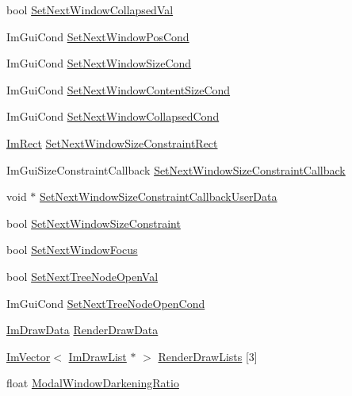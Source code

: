 \begin{DoxyCompactItemize}
\item 
bool \hyperlink{struct_im_gui_context_a81c9c14d3ab622586aa5ca0866634b21}{Set\+Next\+Window\+Collapsed\+Val}
\item 
Im\+Gui\+Cond \hyperlink{struct_im_gui_context_afdf440b5e79ba7868e87e2c5136e1296}{Set\+Next\+Window\+Pos\+Cond}
\item 
Im\+Gui\+Cond \hyperlink{struct_im_gui_context_ad0a5c6930741d040141ab7b097064c20}{Set\+Next\+Window\+Size\+Cond}
\item 
Im\+Gui\+Cond \hyperlink{struct_im_gui_context_af19b3352e14a7ac48f8c9a58e63eda9b}{Set\+Next\+Window\+Content\+Size\+Cond}
\item 
Im\+Gui\+Cond \hyperlink{struct_im_gui_context_a90e757b4703c106ecd41b05670f5799a}{Set\+Next\+Window\+Collapsed\+Cond}
\item 
\hyperlink{struct_im_rect}{Im\+Rect} \hyperlink{struct_im_gui_context_ab0e529d62651845ef9ae265447e1d0c8}{Set\+Next\+Window\+Size\+Constraint\+Rect}
\item 
Im\+Gui\+Size\+Constraint\+Callback \hyperlink{struct_im_gui_context_a304a1bfd5dbcebee45ba8cdfa5d231cb}{Set\+Next\+Window\+Size\+Constraint\+Callback}
\item 
void $\ast$ \hyperlink{struct_im_gui_context_a5da8374c369cff287b16ac7d8e3a7901}{Set\+Next\+Window\+Size\+Constraint\+Callback\+User\+Data}
\item 
bool \hyperlink{struct_im_gui_context_a9d2204e10eb23d9ab8aa653b555fb851}{Set\+Next\+Window\+Size\+Constraint}
\item 
bool \hyperlink{struct_im_gui_context_a11a744f855421fedef4adff0cac48bcb}{Set\+Next\+Window\+Focus}
\item 
bool \hyperlink{struct_im_gui_context_aab81a8f92b73046a0277f77fad4dcc85}{Set\+Next\+Tree\+Node\+Open\+Val}
\item 
Im\+Gui\+Cond \hyperlink{struct_im_gui_context_a2b78c616a3d9d26cfe28c575fe6506dc}{Set\+Next\+Tree\+Node\+Open\+Cond}
\item 
\hyperlink{struct_im_draw_data}{Im\+Draw\+Data} \hyperlink{struct_im_gui_context_a81cacf53454e6dc932a7e3181179a3af}{Render\+Draw\+Data}
\item 
\hyperlink{class_im_vector}{Im\+Vector}$<$ \hyperlink{struct_im_draw_list}{Im\+Draw\+List} $\ast$ $>$ \hyperlink{struct_im_gui_context_a65c7d5bafc5cb52d77d181925ff777da}{Render\+Draw\+Lists} \mbox{[}3\mbox{]}
\item 
float \hyperlink{struct_im_gui_context_ac4088a7de19357cdfeb3ead2d53ffcd8}{Modal\+Window\+Darkening\+Ratio}

\end{DoxyCompactItemize}
